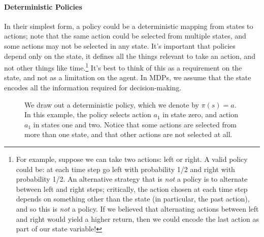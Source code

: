 \documentclass[12pt]{article}
\begin{document}
\paragraph{Deterministic Policies} In their simplest form, a policy could be a deterministic mapping from states to actions; note that the same action could be selected from multiple states, and some actions may not be selected in any state. It's important that policies depend only on the state, it defines all the things relevant to take an action, and not other things like time.\footnote{For example, suppose we can take two actions: left or right. A valid policy could be: at each time step go left with probability 1/2 and right with probability 1/2. An alternative strategy that is \emph{not} a policy is to alternate between left and right steps; critically, the action chosen at each time step depends on something other than the state (in particular, the past action), and so this is \emph{not} a policy. If we believed that alternating actions between left and right would yield a higher return, then we could encode the last action as part of our state variable!} It's best to think of this as a requirement on the state, and not as a limitation on the agent. In MDPs, we assume that the state encodes all the information required for decision-making.

\begin{figure}[h]
  \centering
  \caption{\footnotesize We draw out a deterministic policy, which we denote by $\pi(s) = a$. In this example, the policy selects action $a_1$ in state zero, and action $a_1$ in states one and two. Notice that some actions are selected from more than one state, and that other actions are not selected at all.}
\end{figure}
\end{document}
